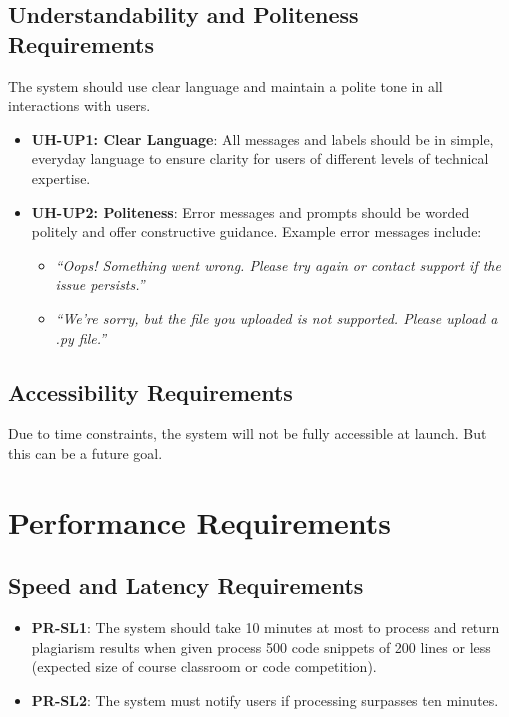 \documentclass[12pt]{article}
\begin{document}
\subsection{Understandability and Politeness Requirements}
The system should use clear language and maintain a polite tone in all 
interactions with users.
\begin{itemize}
    \item \textbf{UH-UP1: Clear Language}: All messages and labels should be in simple, 
    everyday language to ensure clarity for users of different levels of 
    technical expertise.
    
    \item \textbf{UH-UP2: Politeness}: Error messages and prompts should be worded 
    politely and offer constructive guidance. Example error messages include:
    \begin{itemize}
        \item \textit{“Oops! Something went wrong. Please try again or contact 
        support if the issue persists.”}
        \item \textit{“We're sorry, but the file you uploaded is not supported. 
        Please upload a .py file.”}
    \end{itemize}
\end{itemize}

\subsection{Accessibility Requirements}
Due to time constraints, the system will not be fully accessible at launch. But this can be a future goal.

\section{Performance Requirements}
\subsection{Speed and Latency Requirements}
\begin{itemize}
    \item \textbf{PR-SL1}: The system should take 10 minutes at most to process 
    and return plagiarism results when given process 500 code snippets of 200 
    lines or less (expected size of course classroom or code competition).
    \item \textbf{PR-SL2}: The system must notify users if processing surpasses ten minutes.
\end{itemize}
\end{document}

